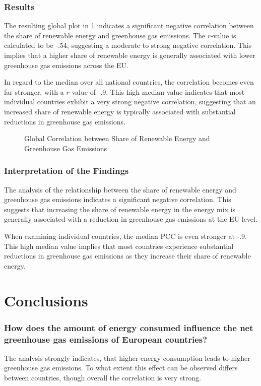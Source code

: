 \documentclass{article}
\begin{document}
\subsubsection*{Results}
The resulting global plot in \cref{plt:global_share_vs_emissions} indicates a significant negative correlation between the share
of renewable energy and greenhouse gas emissions. The $r$-value is calculated to be -.54, suggesting a moderate to strong
negative correlation. This implies that a higher share of renewable energy is generally associated with lower greenhouse gas emissions across the EU.

In regard to the median over all national countries, the correlation becomes even far stronger, with a $r$-value of -.9.
This high median value indicates that most individual countries exhibit a very strong negative correlation,
suggesting that an increased share of renewable energy is typically associated with substantial reductions in greenhouse gas emissions.

\begin{figure}
    \centering
    \resizebox{.7\textwidth}{!}{}
    \caption{Global Correlation between Share of Renewable Energy and Greenhouse Gas Emissions}
    \label{plt:global_share_vs_emissions}
\end{figure}

\subsubsection*{Interpretation of the Findings}
The analysis of the relationship between the share of renewable energy and greenhouse gas emissions indicates a significant negative correlation.
This suggests that increasing the share of renewable energy in the energy mix is generally associated with a reduction in greenhouse gas
emissions at the EU level.

When examining individual countries, the median PCC is even stronger at -.9. This high median value implies that most countries experience
substantial reductions in greenhouse gas emissions as they increase their share of renewable energy.

\section*{Conclusions}
\subsubsection*{How does the amount of energy consumed influence the net greenhouse gas emissions of European countries?}
The analysis strongly indicates, that higher energy consumption leads to higher greenhouse gas emissions.
To what extent this effect can be observed differs between countries, though overall the correlation is very strong.
\end{document}
